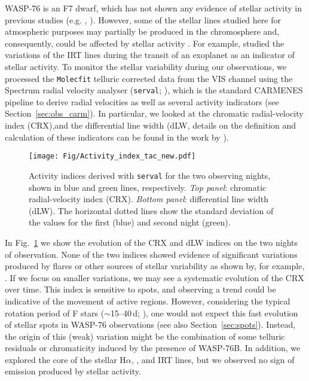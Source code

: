 \documentclass{aa}
\begin{document}
WASP-76 is an F7 dwarf, which has not shown any evidence of stellar activity in previous studies (e.g. \citealt{Zak2019}, \citealt{Essen2020}). However, some of the stellar lines studied here for atmospheric purposes may partially be produced in the chromosphere and, consequently, could be affected by stellar activity \citep{Barnes2017}. For example, \citet{Khalafinejad2018} studied the variations of the  IRT lines during the transit of an exoplanet as an indicator of stellar activity. To monitor the stellar variability during our observations, we processed the {\tt Molecfit} telluric corrected data from the VIS channel using the Spectrum radial velocity analyser ({\tt serval}; \citealt{SERVAL}), which is the standard CARMENES pipeline to derive radial velocities as well as several activity indicators (see Section~\ref{sec:obs_carm}). In particular, we looked at the chromatic radial-velocity index (CRX),and the differential line width (dLW, details on the definition and calculation of these indicators can be found in the work by \citealt{SERVAL}).

\begin{figure}[]
\centering
\texttt{[image: Fig/Activity\_index\_tac\_new.pdf]}
\caption{Activity indices derived with {\tt serval} for the two observing nights, shown in blue and green lines, respectively. 
{\em Top panel}: chromatic radial-velocity index (CRX). 
{\em Bottom panel}: differential line width (dLW). The horizontal dotted lines show the standard deviation of the values for the first (blue) and second night (green).}
\label{fig:activ_index}
\end{figure}

In Fig.~\ref{fig:activ_index} we show the evolution of the CRX and dLW indices on the two nights of observation. None of the two indices showed evidence of significant variations produced by flares or other sources of stellar variability as shown by, for example, \citet{Palle2020b}. If we focus on smaller variations, we may see a systematic evolution of the CRX over time. This index is sensitive to spots, and observing a trend %
could be indicative of the movement of active regions. However, considering the typical rotation period of F stars ($\sim$15--40\,d; \citealt{SuarezM2015,SuarezM2016}), one would not expect this fast evolution of stellar spots in WASP-76 observations (see also Section~\ref{sec:spots}). Instead, the origin of this (weak) variation might be the combination of some telluric residuals or %
chromaticity induced by the presence of WASP-76B. %
In addition, we explored the core of the stellar H$\alpha$, , and  IRT lines, but we observed no sign of emission produced by stellar activity.
\end{document}
